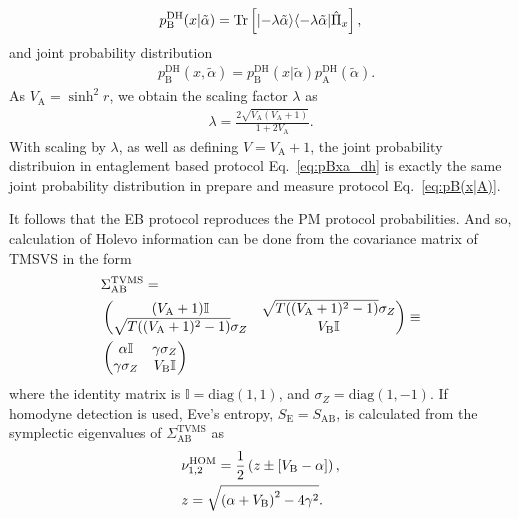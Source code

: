 \documentclass[%
reprint,
superscriptaddress,
 amsmath,amssymb,amsfonts,
 aps,
 pra,
 longbibliography
]{revtex4-2}
\newcommand{\ket}[1]{\ensuremath{|{#1}\rangle}}
\newcommand{\bra}[1]{\ensuremath{\langle{#1}|}}
\newcommand{\Tr}{\mathop{\rm Tr}\nolimits}
\newcommand{\ind}[1]{\mathrm{#1}}
\begin{document}
\begin{align}
\label{eq:pB(x|A)_dh}
    p_{\ind{B}}^{\ind{DH}}(x|\tilde\alpha) = \Tr \left[ \ket{{-\lambda\tilde\alpha}}\bra{{-\lambda\tilde\alpha}}\hat{\Pi}_x \right],
\end{align}
and joint probability distribution
\begin{align}
\label{eq:pBxa_dh}
    &p_{\ind{B}}^{\ind{DH}}(x,\tilde \alpha)=p_{\ind{B}}^{\ind{DH}}(x|\tilde \alpha)
    p_{\ind{A}}^{\ind{DH}}(\tilde \alpha).
\end{align}
As $V_{\ind{A}}=\sinh^2r$, we obtain the scaling factor $\lambda$ as
\begin{align}
  \label{eq:lambda}
  \lambda=\frac{2\sqrt{V_{\ind{A}}\left(V_{\ind{A}}+1\right)}}{1+2V_{\ind{A}}}.
\end{align}
With scaling by $\lambda$, as well as defining $V=V_{\ind{A}}+1$, the joint probability distribuion in entaglement based protocol
Eq.~\eqref{eq:pBxa_dh}
is exactly the same joint probability distribution in prepare and measure protocol Eq.~\eqref{eq:pB(x|A)}.

It follows that the EB protocol reproduces the PM protocol probabilities.
And so, 
calculation of Holevo information can be done from the covariance matrix of TMSVS in the form~\cite{laudenbach2018continuous}
\begin{align}
  \label{eq:TVMS}
    &\Sigma_{\ind{AB}}^{\ind{TVMS}}=\notag\\&\begin{pmatrix}
        (V_{\ind{A}}+1)\mathbb{I}&\sqrt{T((V_{\ind{A}}+1)^2-1)}\sigma_Z\\
        \sqrt{T((V_{\ind{A}}+1)^2-1)}\sigma_Z&V_{\ind{B}}\mathbb{I}
    \end{pmatrix}\equiv\notag\\
    &\begin{pmatrix}
        \alpha\mathbb{I}&\gamma\sigma_Z\\
        \gamma\sigma_Z&V_{\ind{B}}\mathbb{I}
    \end{pmatrix}
\end{align}
where the identity matrix is $\mathbb{I}=\ind{diag}(1,1)$, and $\sigma_Z=\ind{diag}(1,-1)$. If homodyne detection is used, Eve's entropy, $S_{\ind{E}}=S_{\ind{AB}}$, is calculated from the symplectic eigenvalues of $\Sigma_{\ind{AB}}^{\ind{TVMS}}$ as~\cite{Weed:rmp:2012}
\begin{align}
\label{eq:nu12}
    &\nu_{1,2}^{\ind{HOM}} =\frac{1}{2}\left(z\pm\left[V_{\ind{B}}-\alpha\right]\right),\notag\\ &z=\sqrt{\left(\alpha+V_{\ind{B}}\right)^2-4\gamma^2}.
\end{align}
\end{document}
